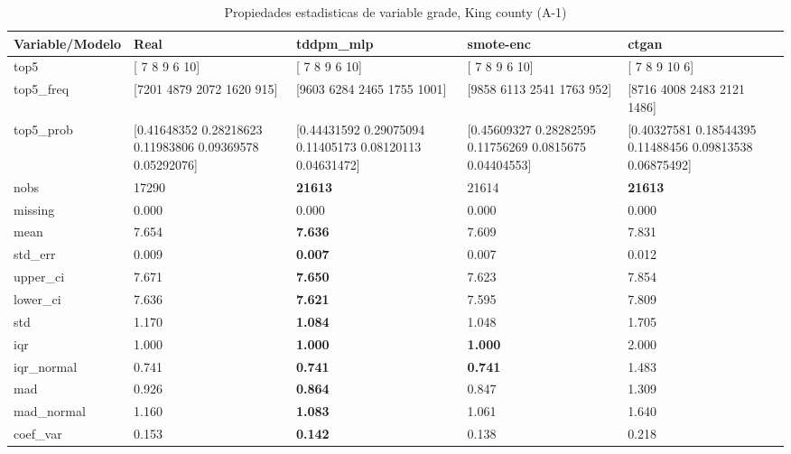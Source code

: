 \begin{table}[H]
\centering
\fontsize{8}{14}\selectfont
\caption{Propiedades  estadisticas de variable grade, King county (A-1)}
\label{table-stats-king county-a-1-grade}
\begin{tabular}{|l|m{10em}|m{10em}|m{10em}|m{10em}|}
\hline
 \rowcolor[gray]{0.8}
Variable/Modelo & Real & tddpm\_mlp & smote-enc & ctgan \\
\hline top5 & [ 7  8  9  6 10] & [ 7  8  9  6 10] & [ 7  8  9  6 10] & [ 7  8  9 10  6] \\
\hline top5\_freq & [7201 4879 2072 1620  915] & [9603 6284 2465 1755 1001] & [9858 6113 2541 1763  952] & [8716 4008 2483 2121 1486] \\
\hline top5\_prob & [0.41648352 0.28218623 0.11983806 0.09369578 0.05292076] & [0.44431592 0.29075094 0.11405173 0.08120113 0.04631472] & [0.45609327 0.28282595 0.11756269 0.0815675  0.04404553] & [0.40327581 0.18544395 0.11488456 0.09813538 0.06875492] \\
\hline nobs & 17290 & \bfseries 21613 & \cellcolor[rgb]{0.9, 0.54, 0.52} 21614 & \bfseries 21613 \\
\hline missing & 0.000 & 0.000 & 0.000 & 0.000 \\
\hline mean & 7.654 & \bfseries 7.636 & 7.609 & \cellcolor[rgb]{0.9, 0.54, 0.52} 7.831 \\
\hline std\_err & 0.009 & \bfseries 0.007 & 0.007 & \cellcolor[rgb]{0.9, 0.54, 0.52} 0.012 \\
\hline upper\_ci & 7.671 & \bfseries 7.650 & 7.623 & \cellcolor[rgb]{0.9, 0.54, 0.52} 7.854 \\
\hline lower\_ci & 7.636 & \bfseries 7.621 & 7.595 & \cellcolor[rgb]{0.9, 0.54, 0.52} 7.809 \\
\hline std & 1.170 & \bfseries 1.084 & 1.048 & \cellcolor[rgb]{0.9, 0.54, 0.52} 1.705 \\
\hline iqr & 1.000 & \bfseries 1.000 & \bfseries 1.000 & \cellcolor[rgb]{0.9, 0.54, 0.52} 2.000 \\
\hline iqr\_normal & 0.741 & \bfseries 0.741 & \bfseries 0.741 & \cellcolor[rgb]{0.9, 0.54, 0.52} 1.483 \\
\hline mad & 0.926 & \bfseries 0.864 & 0.847 & \cellcolor[rgb]{0.9, 0.54, 0.52} 1.309 \\
\hline mad\_normal & 1.160 & \bfseries 1.083 & 1.061 & \cellcolor[rgb]{0.9, 0.54, 0.52} 1.640 \\
\hline coef\_var & 0.153 & \bfseries 0.142 & 0.138 & \cellcolor[rgb]{0.9, 0.54, 0.52} 0.218 \\

\end{tabular}
\end{table}
